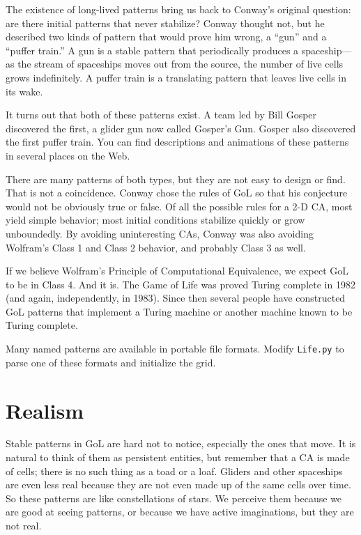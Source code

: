 \documentclass[10pt]{book}
\begin{document}
The existence of long-lived patterns bring us back to Conway's
original question: are there initial patterns that never stabilize?
Conway thought not, but he described two kinds of pattern that would
prove him wrong, a ``gun'' and a ``puffer train.''  A gun is a stable
pattern that periodically produces a spaceship---as the stream of
spaceships moves out from the source, the number of live cells grows
indefinitely.  A puffer train is a translating pattern that leaves
live cells in its wake.

It turns out that both of these patterns exist.  A team led
by Bill Gosper discovered the first, a glider gun now called
Gosper's Gun.  Gosper also discovered the first puffer train.
You can find descriptions and animations of these patterns
in several places on the Web.

There are many patterns of both types, but they are not easy to
design or find.  That is not a coincidence.  Conway chose the
rules of GoL so that his conjecture would not be obviously
true or false.  Of all the possible rules for a 2-D CA, most
yield simple behavior; most initial conditions stabilize quickly
or grow unboundedly.  By avoiding uninteresting CAs, Conway
was also avoiding Wolfram's Class 1 and Class 2 behavior, and
probably Class 3 as well.

If we believe Wolfram's Principle of Computational Equivalence, we
expect GoL to be in Class 4.  And it is.  The Game of Life was proved
Turing complete in 1982 (and again, independently, in 1983).
Since then several people have constructed GoL patterns that implement
a Turing machine or another machine known to be Turing complete.

\begin{exercise}

Many named patterns are available in portable file formats.
Modify {\tt Life.py} to parse one of these formats and initialize
the grid.

\end{exercise}


\section{Realism}

Stable patterns in GoL are hard not to notice, especially the ones
that move.  It is natural to think of them as persistent entities, but
remember that a CA is made of cells; there is no such thing as a toad
or a loaf.  Gliders and other spaceships are even less real because
they are not even made up of the same cells over time.  So these
patterns are like constellations of stars.  We perceive them because
we are good at seeing patterns, or because we have active
imaginations, but they are not real.
\end{document}
